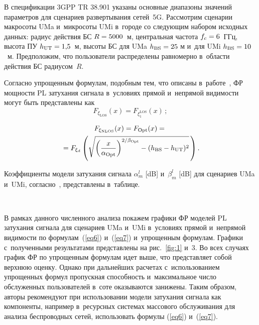 \begin{multicols}{2}
 В спецификации 3GPP TR 38.901 указаны основные диапазоны значений параметров 
для сценариев развертывания сетей~5G. Рассмотрим сценарии макросоты UMa и~микросоты UMi в~городе со следующим набором исходных данных: радиус действия БС 
$R\hm=5000$~м, центральная частота $f_c\hm=6$~ГГц, высота ПУ
$h_{\mathrm{UT}}\hm=1{,}5$~м, высоты БС для UMa $h_{\mathrm{BS}}\hm=25$ м и~для UMi $h_{\mathrm{BS}}\hm=10$~м. 
Предположим, что пользователи распределены равномерно в~об\-ласти действия БС 
радиусом~$R$.

Согласно упрощенным формулам, подобным тем, что описаны в~работе~\cite{Moltchanov2022b}, ФР мощности PL затухания сигнала в~условиях 
прямой и~непрямой видимости могут быть представлены как 
$$
F_{\xi_\mathrm{LOS}}(x) = 
F_{\xi_1^{\mathrm{LOS}}}(x)\,;
$$

\noindent
\begin{multline*}
F_{\xi_\mathrm{NLOS}}(x)=F_{\mathrm{Opt}}(x)={}\\
{}= F_{\xi_d}\left( \sqrt{ 
\left(\displaystyle\frac{\displaystyle x\mathstrut}{\displaystyle \alpha_{\mathrm{Opt}}\mathstrut}\right)^{{2}/{\beta_{\mathrm{Opt}}}} - 
(h_\mathrm{BS}-h_\mathrm{UT})^2 }\,\right).
\end{multline*}

\noindent
 Коэффициенты модели затухания сигнала $\alpha_m^{l}$ 
[dB] и~$\beta_m^{l}$ [dB] для сценариев UMa и~UMi, согласно~\cite{3GPP38901}, 
представлены в~таб\-лице.


 
 \begin{figure*} %
 \vspace*{1pt}
      \begin{center}
     \mbox{%
\epsfxsize=163.204mm 
}
\end{center}
\vspace*{-15pt}
 \label{fig:2}
  \vspace*{-3pt}
 \end{figure*}

 
 

В рамках данного численного анализа покажем графики ФР моделей PL затухания 
сигнала для сценариев UMa и~UMi в~условиях прямой и~непрямой видимости по 
формулам~(\ref{eq6}) и~(\ref{eq7}) и~упрощенным формулам. Графики с~полученными 
результатами представлены на рис.~\ref{fig:1} и~3. Во всех случаях 
график ФР по упрощенным формулам идет выше, что представляет собой 
верхнюю оценку. Однако при дальнейших расчетах с~использованием упрощенных 
формул пропускная спо\-соб\-ность и~максимальное число обслуженных пользователей 
в~соте оказываются занижены. Таким образом, авторы рекомендуют при использовании 
модели затухания сигнала как компоненты, например в~ресурсных сис\-те\-мах массового 
обслуживания для анализа беспроводных сетей, использовать формулы (\ref{eq6}) и~(\ref{eq7}).



\end{multicols}
